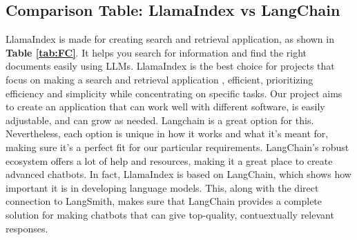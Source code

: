 \subsection{Comparison Table: LlamaIndex vs LangChain}
LlamaIndex is made for creating search and retrieval application, as shown in \textbf{Table \ref{tab:FC}}. It helps you search for information and find the right documents easily using LLMs. LlamaIndex is the best choice for projects that focus on making a search and retrieval application , efficient,  prioritizing efficiency and simplicity while concentrating on specific tasks. Our project aims to create an application that can work well with different software, is easily adjustable, and can grow as needed. Langchain is a great option for this. Nevertheless, each option is unique in how it works and what it's meant for, making sure it's a perfect fit for our particular requirements.
\vskip 0.5cm
LangChain's robust ecosystem offers a lot of help and resources, making it a great place to create advanced chatbots. In fact, LlamaIndex is based on LangChain, which shows how important it is in developing language models. This, along with the direct connection to LangSmith, makes sure that LangChain provides a complete solution for making chatbots that can give top-quality, contuextually relevant responses.
